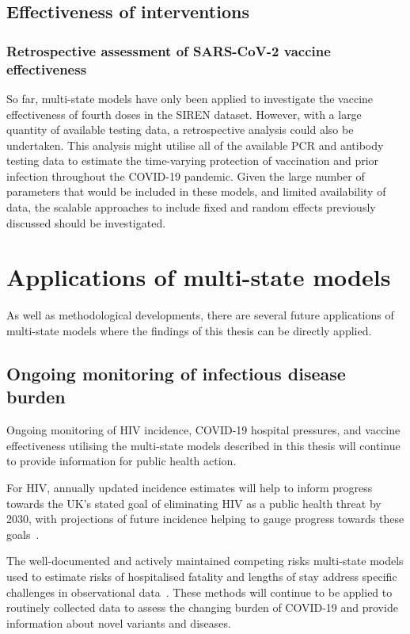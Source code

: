 \subsection{Effectiveness of interventions}

\subsubsection{Retrospective assessment of SARS-CoV-2 vaccine effectiveness}

So far, multi-state models have only been applied to investigate the vaccine effectiveness of fourth doses in the SIREN dataset. However, with a large quantity of available testing data, a retrospective analysis could also be undertaken. This analysis might utilise all of the available PCR and antibody testing data to estimate the time-varying protection of vaccination and prior infection throughout the COVID-19 pandemic. Given the large number of parameters that would be included in these models, and limited availability of data, the scalable approaches to include fixed and random effects previously discussed should be investigated.

\section{Applications of multi-state models}

As well as methodological developments, there are several future applications of multi-state models where the findings of this thesis can be directly applied.

\subsection{Ongoing monitoring of infectious disease burden}

Ongoing monitoring of HIV incidence, COVID-19 hospital pressures, and vaccine effectiveness utilising the multi-state models described in this thesis will continue to provide information for public health action.

For HIV, annually updated incidence estimates will help to inform progress towards the UK's stated goal of eliminating HIV as a public health threat by 2030, with projections of future incidence helping to gauge progress towards these goals~\parencite{HIV_Commission2020-yy}.

The well-documented and actively maintained competing risks multi-state models used to estimate risks of hospitalised fatality and lengths of stay address specific challenges in observational data~\parencite{Jackson2022-lt, Kirwan2022-cs}. These methods will continue to be applied to routinely collected data to assess the changing burden of COVID-19 and provide information about novel variants and diseases.

